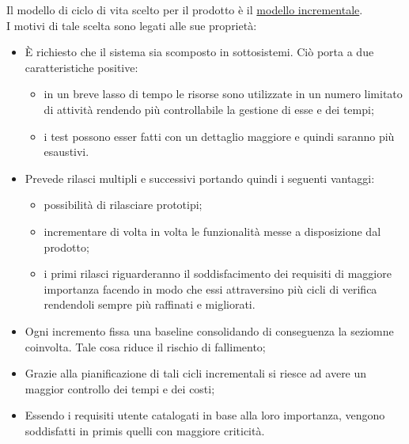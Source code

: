 		Il modello di ciclo di vita scelto per il prodotto è il \underline{modello incrementale}.\\
		I motivi di tale scelta sono legati alle sue proprietà:
		\begin{itemize}
			\item È richiesto che il sistema sia scomposto in sottosistemi. Ciò porta a due caratteristiche positive:
			\begin{itemize}
				\item in un breve lasso di tempo le risorse sono utilizzate in un numero limitato di attività rendendo più controllabile la gestione di esse e dei tempi;
				\item i test possono esser fatti con un dettaglio maggiore e quindi saranno più esaustivi.
			\end{itemize}
			\item Prevede rilasci multipli e successivi portando quindi i seguenti vantaggi:
			\begin{itemize}
				\item possibilità di rilasciare prototipi;
				\item incrementare di volta in volta le funzionalità messe a disposizione dal prodotto;
				\item i primi rilasci riguarderanno il soddisfacimento dei requisiti di maggiore importanza facendo in modo che essi attraversino più cicli di verifica rendendoli sempre più raffinati e migliorati.
			\end{itemize}
			\item Ogni incremento fissa una baseline consolidando di conseguenza la seziomne coinvolta. Tale cosa riduce il rischio di fallimento;
			\item Grazie alla pianificazione di tali cicli incrementali si riesce ad avere un maggior controllo dei tempi e dei costi;
			\item Essendo i requisiti utente catalogati in base alla loro importanza, vengono soddisfatti in primis quelli con maggiore criticità.
		\end{itemize}